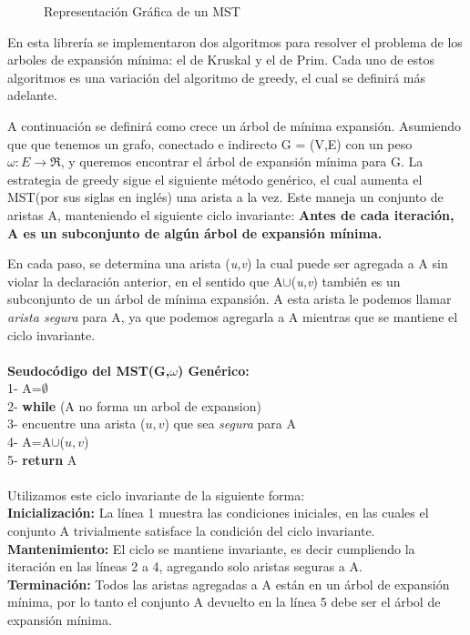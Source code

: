 \documentclass[a4paper, 11pt]{report}
\newcommand{\DrawEJGraph}[5]{

    \begin{scope}[#4]
    \foreach \pos/\nodo in {{(0,0)/4}, {(0,2.2)/5}, {(1.5,1.7)/7}, {(3,3)/1}, {(3,1)/0}, {(4.5,1.7)/2}, {(4.5,3)/3}, {(7,0)/6}}
        \node[vertex] (#3\nodo) at \pos {\nodo};

    \foreach \start/\end/\weight in {4/5/0.35, 5/7/0.28, 7/1/0.19,7/0/0.16,0/2/0.26,2/3/0.17,2/6/0.40,4/7/0.37,1/5/0.32,0/4/0.38,1/2/0.36,1/3/0.29,2/7/0.34,3/6/0.52,6/0/0.58,6/4/0.93}
        \path[edge,#5] (#3\start) --node[weight,midway,fill=white] {$\weight$} (#3\end);

    \foreach \nodo in {#1}
        \node[selected vertex] at (#3\nodo) {\nodo};

    \begin{pgfonlayer}{background}
        \foreach \start/\end in {#2}
            \path[selected edge,#5] (#3\start) -- (#3\end);
    \end{pgfonlayer}
    \end{scope}

}
\begin{document}
\begin{figure}[!h]
    \centering
    \caption{Representaci\'on Gr\'afica de un MST}
    \label{MST1}
\end{figure}

En esta librería se implementaron dos algoritmos para resolver el problema de los arboles de expansión mínima: el de Kruskal y el de Prim. Cada uno de estos algoritmos es una variación del algoritmo de greedy, el cual se definirá más adelante. 

A continuación se definirá como crece un árbol de mínima expansión. Asumiendo que que tenemos un grafo, conectado e indirecto G = (V,E) con un peso $\omega: E \longrightarrow  \Re$, y queremos encontrar el árbol de expansión mínima para G. La estrategia de greedy sigue el siguiente método genérico, el cual aumenta el MST(por sus siglas en inglés) una arista a la vez. Este maneja un conjunto de aristas A, manteniendo el siguiente ciclo invariante: \textbf{Antes de cada iteración, A es un subconjunto de algún árbol de expansión mínima.}

En cada paso, se determina una arista (\textit{u,v}) la cual puede ser agregada a A sin violar la declaración anterior, en el sentido que A$\cup${(\textit{u,v})} también es un subconjunto de un árbol de mínima expansión. A esta arista le podemos llamar \textit{arista segura} para A, ya que podemos agregarla a A mientras que se mantiene el ciclo invariante.\\ \\
\textbf{Seudocódigo del MST(G,$ \omega$) Genérico: }\\
1- A=$ \emptyset$\\
2- \textbf{while} (A no forma un arbol de expansion)\\
3- 	\indent	encuentre una arista ($u,v$) que sea \textit{segura} para A\\ 4- 	\indent	A=A$\cup${($u,v$)}\\
5- \textbf{return} A\\
\\
Utilizamos este ciclo invariante de la siguiente forma:
\\
\textbf{Inicialización:} La línea 1 muestra las condiciones iniciales, en las cuales el conjunto A trivialmente satisface la condición del ciclo invariante.  \\
\textbf{Mantenimiento:} El ciclo se mantiene invariante, es decir cumpliendo la iteración en las líneas 2 a 4, agregando solo aristas seguras a A.\\
\textbf{Terminación:} Todos las aristas agregadas a A están en un árbol de expansión mínima, por lo tanto el conjunto A devuelto en la línea 5 debe ser el árbol de expansión mínima.
\end{document}
